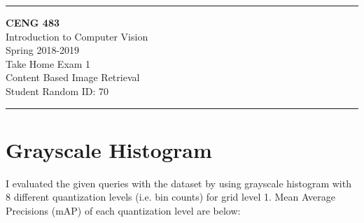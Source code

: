 \documentclass[12pt]{article}
\newcommand{\HRule}{\rule{\linewidth}{1mm}}
\begin{document}
\noindent
\HRule %
\small
\begin{center}
	\LARGE \textbf{CENG 483} \\[4mm]
	\Large Introduction to Computer Vision \\[4mm]
	\normalsize Spring 2018-2019 \\
	\Large Take Home Exam 1 \\
	\Large Content Based Image Retrieval \\
    \Large Student Random ID: 70 \\
\end{center}
\HRule

\begin{center}
\end{center}
\vspace{-10mm}
\section{Grayscale Histogram}
\qquad I evaluated the given queries with the dataset by using grayscale histogram with 8 different quantization levels (i.e. bin counts) for grid level 1. Mean Average Precisions (mAP) of each quantization level are below: \\
\end{document}
